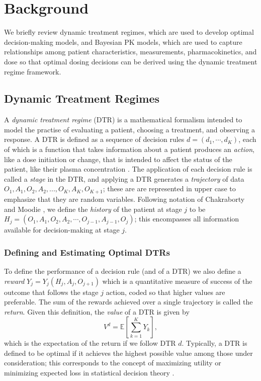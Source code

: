 \section{Background}\label{ss:background}

We briefly review dynamic treatment regimes, which are used to develop optimal decision-making models, and Bayesian PK models, which are used to capture relationships among patient characteristics, measurements, pharmacokinetics, and dose so that optimal dosing decisions can be derived using the dynamic treatment regime framework.

\subsection{Dynamic Treatment Regimes}

A \textit{dynamic treatment regime} (DTR) is a mathematical formalism intended to model the practise of evaluating a patient, choosing a treatment, and observing a response. A DTR is defined as a sequence of decision rules $d = (d_1, \cdots, d_K)$, each of which is a function that takes information about a patient produces an \textit{action}, like a dose initiation or change, that is intended to affect the status of the patient, like their plasma concentration \cite{chakraborty2013statistical,lizotte17reinforcement}. The application of each decision rule is called a \textit{stage} in the DTR, and applying a DTR generates a \textit{trajectory} of data $O_1, A_1, O_2, A_2, ..., O_K, A_K, O_{K+1}$; these are are represented in upper case to emphasize that they are random variables. Following notation of Chakraborty and Moodie \cite{chakraborty2013statistical}, we define the \textit{history} of the patient at stage $j$ to be $ H_j = (O_1, A_1, O_2, A_2, \cdots , O_{j-1}, A_{j-1}, O_j)$; this encompasses all information available for decision-making at stage $j$. 

\subsubsection{Defining and Estimating Optimal DTRs}

To define the performance of a decision rule (and of a DTR) we also define a \textit{reward} $ Y_j = Y_j(H_j, A_j, O_{j+1})$ which is a quantitative measure of success of the outcome that follows the stage $j$ action, coded so that higher values are preferable. The sum of the rewards achieved over a single trajectory is called the \textit{return}.  Given this definition, the \textit{value} of a DTR is given by
\begin{equation}
	V^d = \mathbb{E}\left[ \sum_{k=1}^K Y_k \right],
\end{equation}
which is the expectation of the return if we follow DTR $d$. Typically, a DTR is defined to be optimal if it achieves the highest possible value among those under consideration; this corresponds to the concept of maximizing utility or minimizing expected loss in statistical decision theory \cite{berger2013statistical}.

